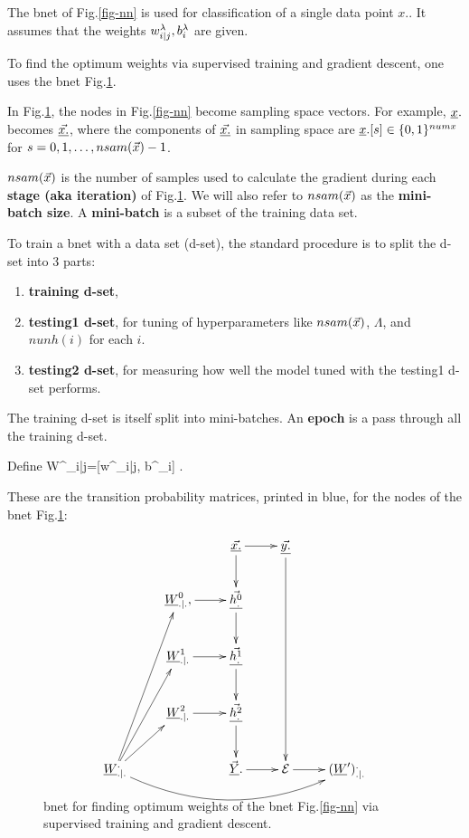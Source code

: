 The bnet of Fig.\ref{fig-nn}
is used for classification
of a single data point $x.$.
It assumes that the
weights $w^\lambda_{i|j}, b_i^\lambda$
are given.

To find the optimum
weights via supervised
training and gradient descent,
one uses the bnet Fig.\ref{fig-nn-ext}.

In Fig.\ref{fig-nn-ext},
the nodes in
Fig.\ref{fig-nn} become 
sampling space vectors.
For example, ${\underline{x}}.$ becomes
$\underline{\vec{x.}}$, where the
components of 
$\underline{\vec{x.}}$ in sampling space are
${\underline{x}}.[s]\in \{0,1\}^{numx}$
for $s=0, 1, \ldots, nsam({\vec{x}})-1$.


$nsam({\vec{x}})$
is the number of
samples used to calculate the
gradient
during each {\bf stage (aka iteration)} of
Fig.\ref{fig-nn-ext}.
We will also  refer to
$nsam({\vec{x}})$ as the {\bf mini-batch size}.
A {\bf mini-batch} is a subset 
of the training data set.



To train a bnet with a data
set (d-set),
the standard procedure
is to split the d-set into 3 parts:
\begin{enumerate}
\item
{\bf training d-set}, 
\item
{\bf testing1 d-set}, for
tuning
of hyperparameters 
like $nsam({\vec{x}})$,  $\Lambda$,
and $nunh(i)$
for each $i$. 
\item
{\bf testing2 d-set}, for measuring
how well the model
tuned with the testing1 d-set
performs.
\end{enumerate}

The training d-set is 
itself split into mini-batches.
An {\bf epoch} is a pass through all 
the training d-set.

Define
\beq
W^\lam_{i|j}=[w^\lam_{i|j}, b^\lam_i]
\;.
\eeq

These are the
transition probability matrices,
printed in blue, for 
the nodes of the bnet 
Fig.\ref{fig-nn-ext}:

\begin{figure}[h!]
\centering
$$\xymatrix{
&&\ranvec{x.}\ar[d]\ar[r]&
\ranvec{y.}\ar[dddd]\\
&\rvW^0_{.|.}, \ar[r]&
\ranvec{h^0_.}\ar[d]\\
&\rvW^1_{.|.}\ar[r]&
\ranvec{h^1_.}\ar[d]\\
&\rvW^2_{.|.}\ar[r]&
\ranvec{h^2_.}\ar[d]\\
\rvW^._{.|.}\ar[ru]\ar[ruu]\ar[ruuu]
\ar@/_2pc/[rrrr]
&&
\vec{\rvY}.\ar[r]&\cale\ar[r]&
(\rvW')^._{.|.}
}$$
\caption{bnet 
for 
finding optimum
weights of the bnet 
Fig.\ref{fig-nn} via
supervised training
and gradient descent.
}
\label{fig-nn-ext}
\end{figure}

